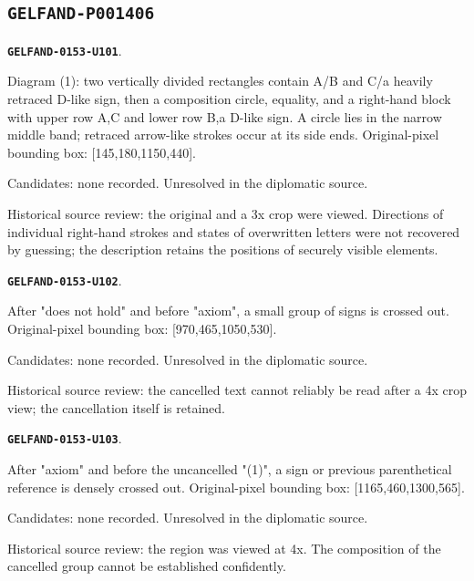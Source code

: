 \documentclass[11pt]{article}
\theoremstyle{definition}
\theoremstyle{remark}
\begin{document}
\subsection*{\texttt{GELFAND-P001406}}
\par\noindent\leavevmode{}\label{GELFAND-0153-U101}\label{GELFAND-P001406:interchange-diagram:note}\textbf{\texttt{GELFAND-0153-U101}}.\nopagebreak[4]\par
Diagram (1): two vertically divided rectangles contain A/B and C/a heavily retraced D-like sign, then a composition circle, equality, and a right-hand block with upper row A,C and lower row B,a D-like sign. A circle lies in the narrow middle band; retraced arrow-like strokes occur at its side ends. Original-pixel bounding box: [145,180,1150,440].\par
Candidates: none recorded. Unresolved in the diplomatic source.\par
Historical source review: the original and a 3x crop were viewed. Directions of individual right-hand strokes and states of overwritten letters were not recovered by guessing; the description retains the positions of securely visible elements.\par\medskip
\par\noindent\leavevmode{}\label{GELFAND-0153-U102}\label{GELFAND-P001406:example-cancel-left:note}\textbf{\texttt{GELFAND-0153-U102}}.\nopagebreak[4]\par
After "does not hold" and before "axiom", a small group of signs is crossed out. Original-pixel bounding box: [970,465,1050,530].\par
Candidates: none recorded. Unresolved in the diplomatic source.\par
Historical source review: the cancelled text cannot reliably be read after a 4x crop view; the cancellation itself is retained.\par\medskip
\par\noindent\leavevmode{}\label{GELFAND-0153-U103}\label{GELFAND-P001406:example-cancel-right:note}\textbf{\texttt{GELFAND-0153-U103}}.\nopagebreak[4]\par
After "axiom" and before the uncancelled "(1)", a sign or previous parenthetical reference is densely crossed out. Original-pixel bounding box: [1165,460,1300,565].\par
Candidates: none recorded. Unresolved in the diplomatic source.\par
Historical source review: the region was viewed at 4x. The composition of the cancelled group cannot be established confidently.\par\medskip
\end{document}
